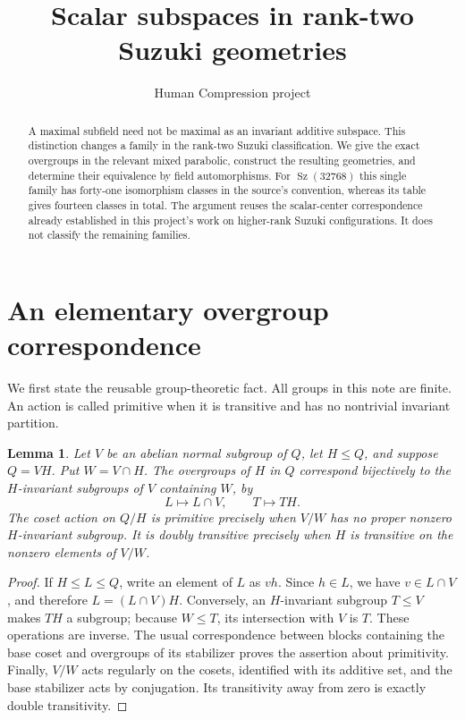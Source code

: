 \documentclass[11pt,a4paper]{article}
\title{Scalar subspaces in rank-two Suzuki geometries}
\author{Human Compression project}\date{}
\newtheorem{lemma}[theorem]{Lemma}
\newcommand{\Sz}{\operatorname{Sz}}
\begin{document}
\maketitle
\begin{abstract}
A maximal subfield need not be maximal as an invariant additive subspace.
This distinction changes a family in the rank-two Suzuki classification.
We give the exact overgroups in the relevant mixed parabolic, construct
the resulting geometries, and determine their equivalence by field
automorphisms. For $\Sz(32768)$ this single family has forty-one
isomorphism classes in the source's convention, whereas its table gives
fourteen classes in total. The argument reuses the scalar-center
correspondence already established in this project's work on higher-rank
Suzuki configurations. It does not classify the remaining families.
\end{abstract}

\section{An elementary overgroup correspondence}
We first state the reusable group-theoretic fact. All groups in this note
are finite. An action is called primitive when it is transitive and has
no nontrivial invariant partition.

\begin{lemma}\label{module}
Let $V$ be an abelian normal subgroup of $Q$, let $H\le Q$, and suppose
$Q=VH$. Put $W=V\cap H$. The overgroups of $H$ in $Q$ correspond
bijectively to the $H$-invariant subgroups of $V$ containing $W$, by
\[
             L\longmapsto L\cap V,\qquad T\longmapsto TH.
\]
The coset action on $Q/H$ is primitive precisely when $V/W$ has no
proper nonzero $H$-invariant subgroup. It is doubly transitive precisely
when $H$ is transitive on the nonzero elements of $V/W$.
\end{lemma}
\begin{proof}
If $H\le L\le Q$, write an element of $L$ as $vh$. Since $h\in L$,
we have $v\in L\cap V$, and therefore $L=(L\cap V)H$. Conversely,
an $H$-invariant subgroup $T\le V$ makes $TH$ a subgroup; because
$W\le T$, its intersection with $V$ is $T$. These operations are
inverse. The usual correspondence between blocks containing the base
coset and overgroups of its stabilizer proves the assertion about
primitivity. Finally, $V/W$ acts regularly on the cosets, identified
with its additive set, and the base stabilizer acts by conjugation.
Its transitivity away from zero is exactly double transitivity.
\end{proof}
\end{document}
